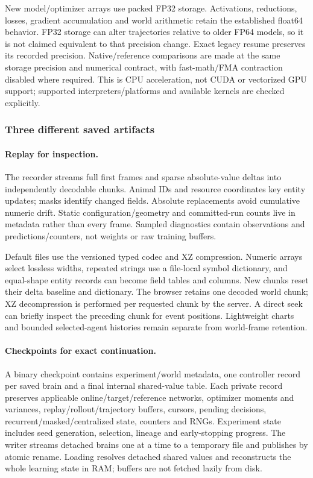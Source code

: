 New model/optimizer arrays use packed FP32 storage. Activations, reductions,
losses, gradient accumulation and world arithmetic retain the established
float64 behavior. FP32 storage can alter trajectories relative to older FP64
models, so it is not claimed equivalent to that precision change. Exact legacy
resume preserves its recorded precision. Native/reference comparisons are made
at the same storage precision and numerical contract, with fast-math/FMA
contraction disabled where required. This is CPU acceleration, not CUDA or
vectorized GPU support; supported interpreters/platforms and available kernels
are checked explicitly.

\subsubsection{Three different saved artifacts}
\paragraph{Replay for inspection.}
The recorder streams full first frames and sparse absolute-value deltas into
independently decodable chunks. Animal IDs and resource coordinates key entity
updates; masks identify changed fields. Absolute replacements avoid cumulative
numeric drift. Static configuration/geometry and committed-run counts live in
metadata rather than every frame. Sampled diagnostics contain observations and
predictions/counters, not weights or raw training buffers.

Default files use the versioned  typed codec and XZ compression.
Numeric arrays select lossless widths, repeated strings use a file-local symbol
dictionary, and equal-shape entity records can become field tables and columns.
New chunks reset their delta baseline and dictionary. The browser retains one
decoded world chunk; XZ decompression is performed per requested chunk by the
server. A direct seek can briefly inspect the preceding chunk for event
positions. Lightweight charts and bounded selected-agent histories remain
separate from world-frame retention.

\paragraph{Checkpoints for exact continuation.}
A binary checkpoint contains experiment/world metadata, one controller record
per saved brain and a final internal shared-value table. Each private record
preserves applicable online/target/reference networks, optimizer moments and
variances, replay/rollout/trajectory buffers, cursors, pending decisions,
recurrent/masked/centralized state, counters and RNGs. Experiment state includes
seed generation, selection, lineage and early-stopping progress. The writer
streams detached brains one at a time to a temporary file and publishes by
atomic rename. Loading resolves detached shared values and reconstructs the
whole learning state in RAM; buffers are not fetched lazily from disk.

